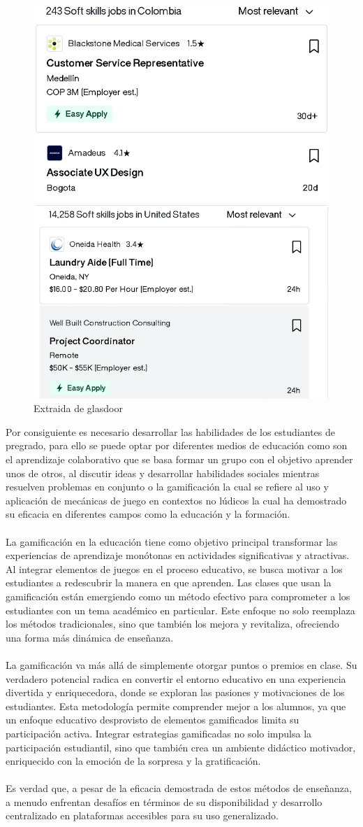 \begin{figure}[ht]
  \centering
  \includegraphics[width=0.5\linewidth]{Imagenes/glasdoor.png}
  \caption{Extraida de glasdoor\cite{q}}
  \label{fig:imagen}
\end{figure}
\newpage
Por consiguiente es necesario desarrollar las habilidades de los estudiantes de pregrado, para ello se puede optar por diferentes medios de educación como son el aprendizaje colaborativo que se basa formar un grupo con el objetivo aprender unos de otros, al discutir ideas y desarrollar habilidades sociales mientras resuelven problemas en conjunto o la gamificación la cual se refiere al uso y aplicación de mecánicas de juego en contextos no lúdicos la cual ha demostrado su eficacia en diferentes campos como la educación y la formación.
\\ \\
La gamificación en la educación tiene como objetivo principal transformar las experiencias de aprendizaje monótonas en actividades significativas y atractivas. Al integrar elementos de juegos en el proceso educativo, se busca motivar a los estudiantes a redescubrir la manera en que aprenden. Las clases que usan la gamificación están emergiendo como un método efectivo para comprometer a los estudiantes con un tema académico en particular. Este enfoque no solo reemplaza los métodos tradicionales, sino que también los mejora y revitaliza, ofreciendo una forma más dinámica de enseñanza.
\\ \\
La gamificación va más allá de simplemente otorgar puntos o premios en clase. Su verdadero potencial radica en convertir el entorno educativo en una experiencia divertida y enriquecedora, donde se exploran las pasiones y motivaciones de los estudiantes. Esta metodología permite comprender mejor a los alumnos, ya que un enfoque educativo desprovisto de elementos gamificados limita su participación activa. Integrar estrategias gamificadas no solo impulsa la participación estudiantil, sino que también crea un ambiente didáctico motivador, enriquecido con la emoción de la sorpresa y la gratificación.\cite{e}
\\ \\
Es verdad que, a pesar de la eficacia demostrada de estos métodos de enseñanza, a menudo enfrentan desafíos en términos de su disponibilidad y desarrollo centralizado en plataformas accesibles para su uso generalizado.
